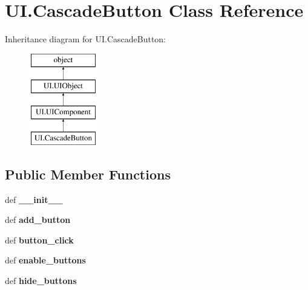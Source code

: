 \hypertarget{classUI_1_1CascadeButton}{\section{U\-I.\-Cascade\-Button Class Reference}
\label{classUI_1_1CascadeButton}
}
Inheritance diagram for U\-I.\-Cascade\-Button\-:\begin{figure}[H]
\begin{center}
\leavevmode
\includegraphics[height=4.000000cm]{classUI_1_1CascadeButton}
\end{center}
\end{figure}
\subsection*{Public Member Functions}
\begin{DoxyCompactItemize}
\item 
\hypertarget{classUI_1_1CascadeButton_a734e71bdf956a37ed998b16d470a9be4}{def {\bfseries \-\_\-\-\_\-init\-\_\-\-\_\-}}\label{classUI_1_1CascadeButton_a734e71bdf956a37ed998b16d470a9be4}

\item 
\hypertarget{classUI_1_1CascadeButton_a326430486252c04954c64fe4dae3ad23}{def {\bfseries add\-\_\-button}}\label{classUI_1_1CascadeButton_a326430486252c04954c64fe4dae3ad23}

\item 
\hypertarget{classUI_1_1CascadeButton_aad5dbe957f247572cd8d638f9f6898eb}{def {\bfseries button\-\_\-click}}\label{classUI_1_1CascadeButton_aad5dbe957f247572cd8d638f9f6898eb}

\item 
\hypertarget{classUI_1_1CascadeButton_a4a59c23b5d0ec44c62e9f4c22b665121}{def {\bfseries enable\-\_\-buttons}}\label{classUI_1_1CascadeButton_a4a59c23b5d0ec44c62e9f4c22b665121}

\item 
\hypertarget{classUI_1_1CascadeButton_aa438d1cd30daa5fd8ba545ccc2e8e077}{def {\bfseries hide\-\_\-buttons}}\label{classUI_1_1CascadeButton_aa438d1cd30daa5fd8ba545ccc2e8e077}

\end{DoxyCompactItemize}
